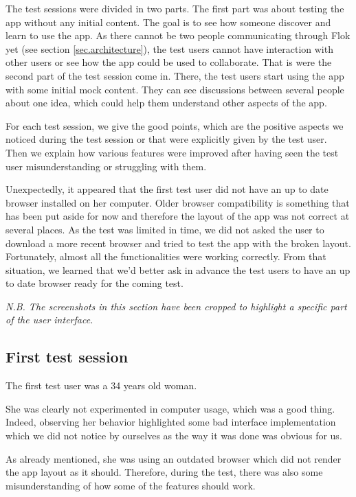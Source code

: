 \documentclass[a4paper,12pt, oneside]{article}
\begin{document}
The test sessions were divided in two parts.
The first part was about testing the app without any initial content.
The goal is to see how someone discover and learn to use the app.
As there cannot be two people communicating through Flok yet (see section \ref{sec.architecture}), the test users cannot have interaction with other users or see how the app could be used to collaborate.
That is were the second part of the test session come in.
There, the test users start using the app with some initial mock content.
They can see discussions between several people about one idea, which could help them understand other aspects of the app.

For each test session, we give the good points, which are the positive aspects we noticed during the test session or that were explicitly given by the test user.
Then we explain how various features were improved after having seen the test user misunderstanding or struggling with them.

Unexpectedly, it appeared that the first test user did not have an up to date browser installed on her computer.
Older browser compatibility is something that has been put aside for now and therefore the layout of the app was not correct at several places.
As the test was limited in time, we did not asked the user to download a more recent browser and tried to test the app with the broken layout.
Fortunately, almost all the functionalities were working correctly.
From that situation, we learned that we'd better ask in advance the test users to have an up to date browser ready for the coming test.

\emph{N.B. The screenshots in this section have been cropped to highlight a specific part of the user interface.}

\subsection{First test session}
The first test user was a 34 years old woman.

She was clearly not experimented in computer usage, which was a good thing.
Indeed, observing her behavior highlighted some bad interface implementation which we did not notice by ourselves as the way it was done was obvious for us.

As already mentioned, she was using an outdated browser which did not render the app layout as it should.
Therefore, during the test, there was also some misunderstanding of how some of the features should work.
\end{document}
